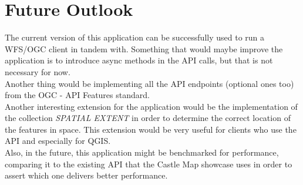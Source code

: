 \section*{Future Outlook}
The current version of this application can be successfully used to run a WFS/OGC client in tandem with.
Something that would maybe improve the application is to introduce async methods in the API calls, but that is not necessary for now.\\
Another thing would be implementing all the API endpoints (optional ones too) from the OGC - API Features standard.\\
Another interesting extension for the application would be the implementation of the collection \textit{SPATIAL EXTENT} in order to determine the correct location of the features in space. This extension would be very useful for clients who use the API and especially for QGIS.\\
Also, in the future, this application might be benchmarked for performance, comparing it to the existing API that the Castle Map showcase uses in order to assert which one delivers better performance.
